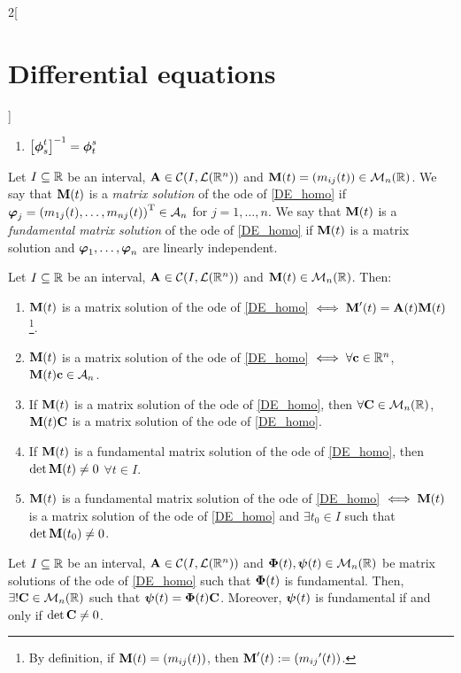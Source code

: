 \documentclass[../../../main.tex]{subfiles}
\begin{document}
\begin{multicols}{2}[\section{Differential equations}]
\begin{corollary}
\begin{enumerate}
            \item ${\left[\boldsymbol{\mathrm{\phi}}_s^t\right]}^{-1}=\boldsymbol{\mathrm{\phi}}_t^s$
        \end{enumerate}
    \end{corollary}
    \begin{definition}
        Let $I\subseteq \mathbb{R}$ be an interval, $\boldsymbol{\mathrm{A}}\in\mathcal{C}(I,\mathcal{L}(\mathbb{R}^n))$ and $\boldsymbol{\mathrm{M}}(t)=(m_{ij}(t))\in\mathcal{M}_n(\mathbb{R})$. We say that $\boldsymbol{\mathrm{M}}(t)$ is a \textit{matrix solution} of the ode of \cref{DE_homo} if $\boldsymbol{\mathrm{\varphi}}_j={(m_{1j}(t),\ldots,m_{nj}(t))}^\mathrm{T}\in\mathcal{A}_n$ for $j=1,\ldots,n$. We say that $\boldsymbol{\mathrm{M}}(t)$ is a \textit{fundamental matrix solution} of the ode of \cref{DE_homo} if $\boldsymbol{\mathrm{M}}(t)$ is a matrix solution and $\boldsymbol{\mathrm{\varphi}}_1,\ldots,\boldsymbol{\mathrm{\varphi}}_n$ are linearly independent.
    \end{definition}
    \begin{prop}
        Let $I\subseteq \mathbb{R}$ be an interval, $\boldsymbol{\mathrm{A}}\in\mathcal{C}(I,\mathcal{L}(\mathbb{R}^n))$ and $\boldsymbol{\mathrm{M}}(t)\in\mathcal{M}_n(\mathbb{R})$. Then:
        \begin{enumerate}
            \item $\boldsymbol{\mathrm{M}}(t)$ is a matrix solution of the ode of \cref{DE_homo} $\iff\boldsymbol{\mathrm{M}}'(t)=\boldsymbol{\mathrm{A}}(t)\boldsymbol{\mathrm{M}}(t)$\footnote{By definition, if $\boldsymbol{\mathrm{M}}(t)=(m_{ij}(t))$, then $\boldsymbol{\mathrm{M}}'(t):=({m_{ij}}'(t))$.}.
            \item $\boldsymbol{\mathrm{M}}(t)$ is a matrix solution of the ode of \cref{DE_homo} $\iff\forall \boldsymbol{\mathrm{c}}\in\mathbb{R}^n$, $\boldsymbol{\mathrm{M}}(t)\boldsymbol{\mathrm{c}}\in\mathcal{A}_n$.
            \item If $\boldsymbol{\mathrm{M}}(t)$ is a matrix solution of the ode of \cref{DE_homo}, then $\forall \boldsymbol{\mathrm{C}}\in\mathcal{M}_n(\mathbb{R})$, $\boldsymbol{\mathrm{M}}(t)\boldsymbol{\mathrm{C}}$ is a matrix solution of the ode of \cref{DE_homo}.
            \item If $\boldsymbol{\mathrm{M}}(t)$ is a fundamental matrix solution of the ode of \cref{DE_homo}, then $\det\boldsymbol{\mathrm{M}}(t)\ne 0$ $\forall t\in I$.
            \item $\boldsymbol{\mathrm{M}}(t)$ is a fundamental matrix solution of the ode of \cref{DE_homo} $\iff\boldsymbol{\mathrm{M}}(t)$ is a matrix solution of the ode of \cref{DE_homo} and $\exists t_0\in I$ such that $\det\boldsymbol{\mathrm{M}}(t_0)\ne 0$.
        \end{enumerate}
    \end{prop}
    \begin{prop}
        Let $I\subseteq \mathbb{R}$ be an interval, $\boldsymbol{\mathrm{A}}\in\mathcal{C}(I,\mathcal{L}(\mathbb{R}^n))$ and $\boldsymbol{\mathrm{\Phi}}(t),\boldsymbol{\mathrm{\psi}}(t)\in\mathcal{M}_n(\mathbb{R})$ be matrix solutions of the ode of \cref{DE_homo} such that $\boldsymbol{\mathrm{\Phi}}(t)$ is fundamental. Then, $\exists! \boldsymbol{\mathrm{C}}\in\mathcal{M}_n(\mathbb{R})$ such that $\boldsymbol{\mathrm{\psi}}(t)=\boldsymbol{\mathrm{\Phi}}(t)\boldsymbol{\mathrm{C}}$. Moreover, $\boldsymbol{\mathrm{\psi}}(t)$ is fundamental if and only if $\det \boldsymbol{\mathrm{C}}\ne 0$.
    \end{prop}

\end{multicols}
\end{document}
